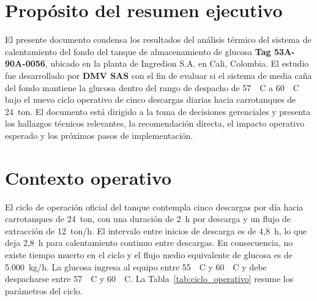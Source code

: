 \documentclass[11pt,a4paper]{article}
\begin{document}


\section{Propósito del resumen ejecutivo}

El presente documento condensa los resultados del análisis térmico del sistema de calentamiento del fondo del tanque de almacenamiento de glucosa \textbf{Tag 53A-90A-0056}, ubicado en la planta de Ingredion S.A. en Cali, Colombia. El estudio fue desarrollado por \textbf{DMV SAS} con el fin de evaluar si el sistema de media caña del fondo mantiene la glucosa dentro del rango de despacho de 57~~\textdegree C a 60~~\textdegree C bajo el nuevo ciclo operativo de cinco descargas diarias hacia carrotanques de 24~ton. El documento está dirigido a la toma de decisiones gerenciales y presenta los hallazgos técnicos relevantes, la recomendación directa, el impacto operativo esperado y los próximos pasos de implementación.

\section{Contexto operativo}

El ciclo de operación oficial del tanque contempla cinco descargas por día hacia carrotanques de 24~ton, con una duración de 2~h por descarga y un flujo de extracción de 12~ton/h. El intervalo entre inicios de descarga es de 4,8~h, lo que deja 2,8~h para calentamiento continuo entre descargas. En consecuencia, no existe tiempo muerto en el ciclo y el flujo medio equivalente de glucosa es de 5.000~kg/h. La glucosa ingresa al equipo entre 55~~\textdegree C y 60~~\textdegree C y debe despacharse entre 57~~\textdegree C y 60~~\textdegree C. La Tabla~\ref{tab:ciclo_operativo} resume los parámetros del ciclo.
\end{document}
